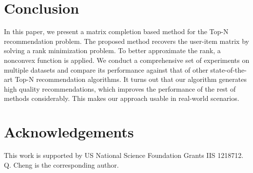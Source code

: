 \documentclass[letterpaper]{article}
\begin{document}
\section{Conclusion}
In this paper, we present a matrix completion based method for the Top-N recommendation problem. The proposed method recovers the user-item matrix by solving a rank minimization problem. To better approximate the rank, a nonconvex function is applied. We conduct a comprehensive set of experiments on multiple datasets and compare its performance against that of other state-of-the-art Top-N recommendation algorithms. It turns out that our algorithm generates high quality recommendations, which improves the performance of the rest of methods considerably. This makes our approach usable in real-world scenarios.
\section{Acknowledgements}
This work is supported by US National Science Foundation Grants IIS 1218712. Q. Cheng is the corresponding author.
\vfill\eject
%
%
\end{document}
